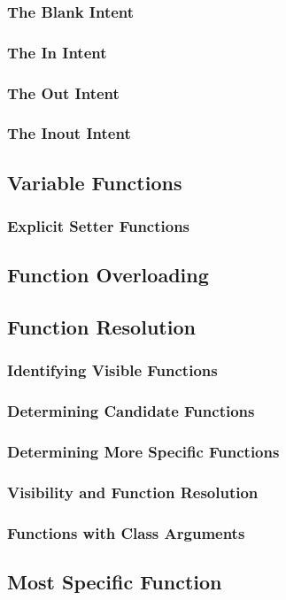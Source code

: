 \documentclass[10pt,twoside,titlepage]{article}
\begin{document}
\subsubsection{The Blank Intent}
\subsubsection{The In Intent}
\subsubsection{The Out Intent}
\subsubsection{The Inout Intent}
\subsection{Variable Functions}
\subsubsection{Explicit Setter Functions}
\subsection{Function Overloading}
\subsection{Function Resolution}
\subsubsection{Identifying Visible Functions}
\subsubsection{Determining Candidate Functions}
\subsubsection{Determining More Specific Functions}
\subsubsection{Visibility and Function Resolution}
\subsubsection{Functions with Class Arguments}
\subsection{Most Specific Function}
\end{document}
